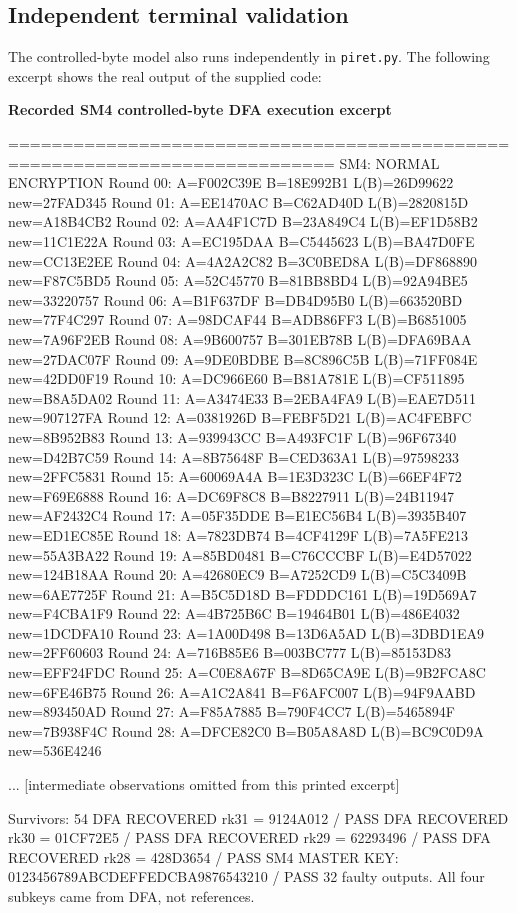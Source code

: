 \subsection{Independent terminal validation}
The controlled-byte model also runs independently in \texttt{piret.py}. The following excerpt shows the real output of the supplied code:
\par\smallskip\noindent\textbf{Recorded SM4 controlled-byte DFA execution excerpt}\par
\begin{lightcode}

============================================================================
SM4: NORMAL ENCRYPTION
Round 00: A=F002C39E B=18E992B1 L(B)=26D99622 new=27FAD345
Round 01: A=EE1470AC B=C62AD40D L(B)=2820815D new=A18B4CB2
Round 02: A=AA4F1C7D B=23A849C4 L(B)=EF1D58B2 new=11C1E22A
Round 03: A=EC195DAA B=C5445623 L(B)=BA47D0FE new=CC13E2EE
Round 04: A=4A2A2C82 B=3C0BED8A L(B)=DF868890 new=F87C5BD5
Round 05: A=52C45770 B=81BB8BD4 L(B)=92A94BE5 new=33220757
Round 06: A=B1F637DF B=DB4D95B0 L(B)=663520BD new=77F4C297
Round 07: A=98DCAF44 B=ADB86FF3 L(B)=B6851005 new=7A96F2EB
Round 08: A=9B600757 B=301EB78B L(B)=DFA69BAA new=27DAC07F
Round 09: A=9DE0BDBE B=8C896C5B L(B)=71FF084E new=42DD0F19
Round 10: A=DC966E60 B=B81A781E L(B)=CF511895 new=B8A5DA02
Round 11: A=A3474E33 B=2EBA4FA9 L(B)=EAE7D511 new=907127FA
Round 12: A=0381926D B=FEBF5D21 L(B)=AC4FEBFC new=8B952B83
Round 13: A=939943CC B=A493FC1F L(B)=96F67340 new=D42B7C59
Round 14: A=8B75648F B=CED363A1 L(B)=97598233 new=2FFC5831
Round 15: A=60069A4A B=1E3D323C L(B)=66EF4F72 new=F69E6888
Round 16: A=DC69F8C8 B=B8227911 L(B)=24B11947 new=AF2432C4
Round 17: A=05F35DDE B=E1EC56B4 L(B)=3935B407 new=ED1EC85E
Round 18: A=7823DB74 B=4CF4129F L(B)=7A5FE213 new=55A3BA22
Round 19: A=85BD0481 B=C76CCCBF L(B)=E4D57022 new=124B18AA
Round 20: A=42680EC9 B=A7252CD9 L(B)=C5C3409B new=6AE7725F
Round 21: A=B5C5D18D B=FDDDC161 L(B)=19D569A7 new=F4CBA1F9
Round 22: A=4B725B6C B=19464B01 L(B)=486E4032 new=1DCDFA10
Round 23: A=1A00D498 B=13D6A5AD L(B)=3DBD1EA9 new=2FF60603
Round 24: A=716B85E6 B=003BC777 L(B)=85153D83 new=EFF24FDC
Round 25: A=C0E8A67F B=8D65CA9E L(B)=9B2FCA8C new=6FE46B75
Round 26: A=A1C2A841 B=F6AFC007 L(B)=94F9AABD new=893450AD
Round 27: A=F85A7885 B=790F4CC7 L(B)=5465894F new=7B938F4C
Round 28: A=DFCE82C0 B=B05A8A8D L(B)=BC9C0D9A new=536E4246

... [intermediate observations omitted from this printed excerpt]

Survivors: 54
DFA RECOVERED rk31 = 9124A012 / PASS
DFA RECOVERED rk30 = 01CF72E5 / PASS
DFA RECOVERED rk29 = 62293496 / PASS
DFA RECOVERED rk28 = 428D3654 / PASS
SM4 MASTER KEY: 0123456789ABCDEFFEDCBA9876543210 / PASS
32 faulty outputs. All four subkeys came from DFA, not references.
\end{lightcode}

